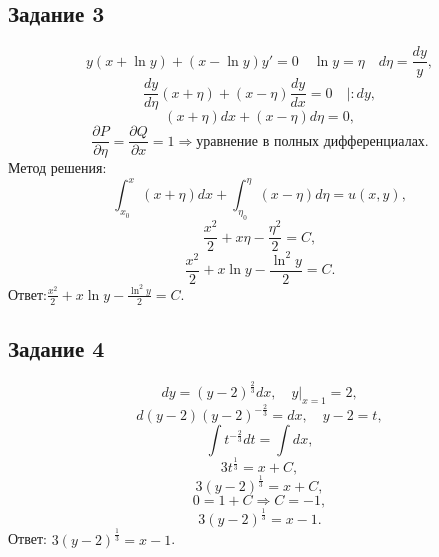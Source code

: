 \documentclass[11pt, a4paper]{article}
\begin{document}
	
	\subsection*{Задание 3}
	
	\par
	\begin{equation*}
    	y(x+\ln y)+(x-\ln y)y'=0 \quad \ln y = \eta \quad d\eta=\frac{dy}{y},
	\end{equation*}
	\begin{equation*}
    	\frac{dy}{d\eta}(x+\eta)+(x-\eta)\frac{dy}{dx}=0 \quad |:dy,
	\end{equation*}
	\begin{equation*}
    	(x+\eta)dx+(x-\eta)d\eta=0,
	\end{equation*}
	\begin{equation*}
    	\frac{\partial P}{\partial \eta}=\frac{\partial Q}{\partial x}=1 \Rightarrow \text{уравнение в полных дифференциалах}.
	\end{equation*}
	Метод решения:
	\begin{equation*}
    	\int_{x_0}^{x}(x+\eta)dx+\int_{\eta_0}^{\eta}(x-\eta)d\eta=u(x,y),
	\end{equation*}
	\begin{equation*}
    	\frac{x^2}{2}+x\eta-\frac{\eta^2}{2}=C,
	\end{equation*}
	\begin{equation*}
    	\frac{x^2}{2}+x\ln y-\frac{\ln^2{y}}{2}=C.
	\end{equation*}
	Ответ:$\frac{x^2}{2}+x\ln y-\frac{\ln^2{y}}{2}=C$.
	
	
	\subsection*{Задание 4}
	
	\par
	\begin{equation*}
    	dy=(y-2)^{\frac{2}{3}}dx,\quad y|_{x=1}=2,
	\end{equation*}
	\begin{equation*}
    	d(y-2)(y-2)^{-\frac{2}{3}}=dx, \quad y-2=t,
	\end{equation*}
	\begin{equation*}
    	\int t^{-\frac{2}{3}}dt=\int dx,
	\end{equation*}
	\begin{equation*}
    	3t^{\frac{1}{3}}=x+C,
	\end{equation*}
	\begin{equation*}
    	3(y-2)^{\frac{1}{3}}=x+C,
	\end{equation*}
	\begin{equation*}
    	0=1+C \Rightarrow C=-1,
	\end{equation*}
	\begin{equation*}
    	3(y-2)^{\frac{1}{3}}=x-1.
	\end{equation*}
	Ответ: $3(y-2)^{\frac{1}{3}}=x-1$.
	
\end{document}
